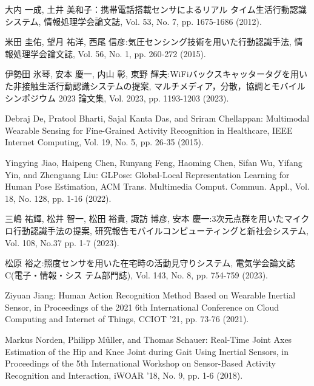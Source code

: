 \begin{thebibliography}{参考文献}
	大内 一成, 土井 美和子：携帯電話搭載センサによるリアル
	タイム生活行動認識システム, 情報処理学会論文誌, Vol. 53,
	No. 7, pp. 1675-1686 (2012).

	米田 圭佑, 望月 祐洋, 西尾 信彦:気圧センシング技術を用いた行動認識手法, 情報処理学会論文誌, Vol. 56, No. 1, pp. 260-272 (2015).

	伊勢田 氷琴, 安本 慶一, 内山 彰, 東野 輝夫:WiFiバックスキャッタータグを用いた非接触生活行動認識システムの提案, マルチメディア，分散，協調とモバイルシンポジウム 2023 論文集, Vol. 2023, pp. 1193-1203 (2023).

	Debraj De, Pratool Bharti, Sajal Kanta Das, and Sriram Chellappan: Multimodal Wearable Sensing for Fine-Grained Activity Recognition in Healthcare, IEEE Internet Computing, Vol. 19, No. 5, pp. 26-35 (2015).

	Yingying Jiao, Haipeng Chen, Runyang Feng, Haoming Chen, Sifan Wu, Yifang Yin, and Zhenguang Liu: GLPose: Global-Local Representation Learning for Human Pose Estimation, ACM Trans. Multimedia Comput. Commun. Appl., Vol. 18, No. 128, pp. 1-16 (2022).

	三嶋 祐輝, 松井 智一, 松田 裕貴, 諏訪 博彦, 安本 慶一:3次元点群を用いたマイクロ行動認識手法の提案, 研究報告モバイルコンピューティングと新社会システム, Vol. 108, No.37 pp. 1-7 (2023).

	松原 裕之:照度センサを用いた在宅時の活動見守りシステム, 電気学会論文誌C(電子・情報・シス テム部門誌), Vol. 143, No. 8, pp. 754-759 (2023).

	Ziyuan Jiang: Human Action Recognition Method Based on Wearable Inertial Sensor, in Proceedings of the 2021 6th International Conference on Cloud Computing and Internet of Things, CCIOT '21, pp. 73-76 (2021).

	Markus Norden, Philipp Műller, and Thomas Schauer: Real-Time Joint Axes Estimation of the Hip and Knee Joint during Gait Using Inertial Sensors, in Proceedings of the 5th International Workshop on Sensor-Based Activity Recognition and Interaction, iWOAR '18, No. 9, pp. 1-6 (2018).


\end{thebibliography}
